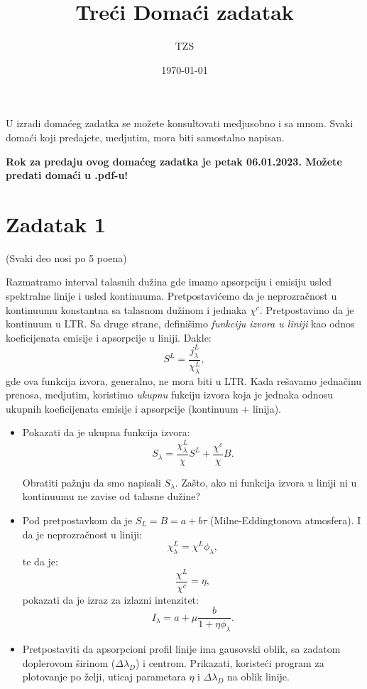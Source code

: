 \documentclass[12pt]{article}
\title{Tre\'{c}i Doma\'{c}i zadatak}
\author{TZS}
\date{\today}
\begin{document}
\maketitle

U izradi doma\'{c}eg zadatka se mo\v{z}ete konsultovati medjusobno i sa mnom. Svaki doma\'{c}i koji predajete, medjutim, mora biti samostalno napisan. 

\textbf{Rok za predaju ovog doma\'{c}eg zadatka je petak 06.01.2023. Mo\v{z}ete predati doma\'{c}i u .pdf-u!}

\section*{Zadatak 1}

(Svaki deo nosi po 5 poena)

Razmatramo interval talasnih du\v{z}ina gde imamo apsorpciju i emisiju usled spektralne linije i usled kontinuuma. Pretpostavi\'{c}emo da je neprozra\v{c}nost u kontinuumu konstantna sa talasnom du\v{z}inom i jednaka $\chi^c$. Pretpostavimo da je kontinuum u LTR. Sa druge strane, defini\v{s}imo \emph{funkciju izvora u liniji} kao odnos koeficijenata emisije i apsorpcije u liniji. Dakle:
\begin{equation}
S^L = \frac{j_\lambda^L}{\chi_\lambda^L},
\end{equation}
gde ova funkcija izvora, generalno, ne mora biti u LTR. Kada re\v{s}avamo jedna\v{c}inu prenosa, medjutim, koristimo \emph{ukupnu} fukciju izvora koja je jednaka odnosu ukupnih koeficijenata emisije i apsorpcije (kontinuum + linija).

\begin{itemize}
\item Pokazati da je ukupna funkcija izvora:
\begin{equation}
S_\lambda = \frac{\chi^L_\lambda}{\chi} S^L + \frac{\chi^c}{\chi} B.
\end{equation}

Obratiti pa\v{z}nju da smo napisali $S_\lambda$. Za\v{s}to, ako ni funkcija izvora u liniji ni u kontinuumu ne zavise od talasne du\v{z}ine?

\item Pod pretpostavkom da je $S_L = B = a+b\tau$ (Milne-Eddingtonova atmosfera). I da je neprozra\v{c}nost u liniji:
\begin{equation}
\chi^L_\lambda = \chi^L \phi_\lambda,
\end{equation}
te da je: 
\begin{equation}
\frac{\chi^L}{\chi^c} = \eta,
\end{equation}
pokazati da je izraz za izlazni intenzitet:
\begin{equation}
I_\lambda = a + \mu\frac{b}{1+\eta \phi_\lambda}.
\end{equation}

\item Pretpostaviti da apsorpcioni profil linije ima gausovski oblik, sa zadatom doplerovom \v{s}irinom ($\Delta \lambda_D$) i centrom. Prikazati, koriste\'{c}i program za plotovanje po \v{z}elji, uticaj parametara $\eta$ i $\Delta \lambda _D$ na oblik linije.
\end{itemize}
\end{document}
